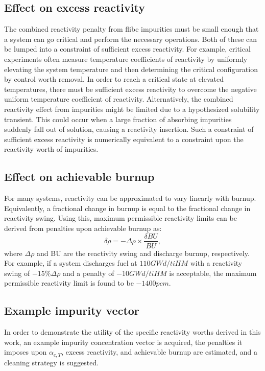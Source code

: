 \documentclass[11pt]{article}
\begin{document}
\subsection{Effect on excess reactivity}

The combined reactivity penalty from flibe impurities must be small enough that a system can go critical and perform the necessary operations.
Both of these can be lumped into a constraint of sufficient excess reactivity.
For example, critical experiments often measure temperature coefficients of reactivity by uniformly elevating the system temperature and then determining the critical configuration by control worth removal.
In order to reach a critical state at elevated temperatures, there must be sufficient excess reactivity to overcome the negative uniform temperature coefficient of reactivity.
Alternatively, the combined reactivity effect from impurities might be limited due to a hypothesized solubility transient.
This could occur when a large fraction of absorbing impurities suddenly fall out of solution, causing a reactivity insertion.
Such a constraint of sufficient excess reactivity is numerically equivalent to a constraint upon the reactivity worth of impurities.

\subsection{Effect on achievable burnup}
\label{sec:exampleBurnup}

For many systems, reactivity can be approximated to vary linearly with burnup.
Equivalently, a fractional change in burnup is equal to the fractional change in reactivity swing.
Using this, maximum permissible reactivity limits can be derived from penalties upon achievable burnup as:
\begin{equation}
    \delta\rho
    =- \Delta\rho \times \frac{\delta BU}{BU}
    ,
\end{equation}
where $\Delta\rho$ and BU are the reactivity swing and discharge burnup, respectively.
For example, if a system discharges fuel at $110GWd/tiHM$ with a reactivity swing of $-15\%\Delta\rho$ and a penalty of $-10GWd/tiHM$ is acceptable, the maximum permissible reactivity limit is found to be $-1400pcm$.

\subsection{Example impurity vector}

In order to demonstrate the utility of the specific reactivity worths derived in this work, an example impurity concentration vector is acquired, the penalties it imposes upon $\alpha_{c,T}$, excess reactivity, and achievable burnup are estimated, and a cleaning strategy is suggested.
\end{document}
